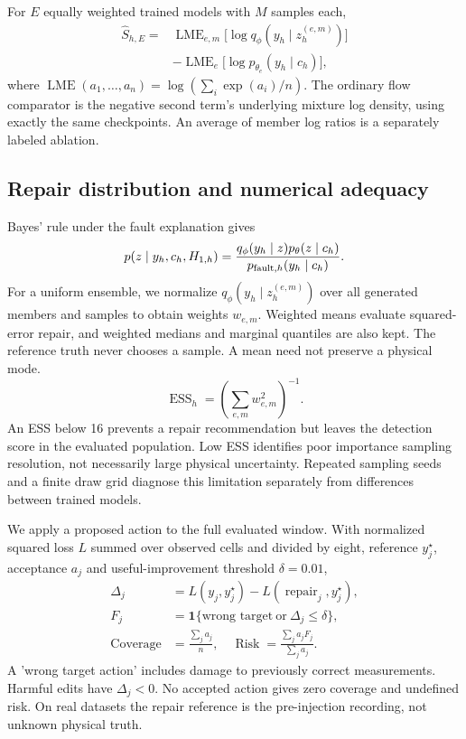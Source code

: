 \documentclass[conference]{IEEEtran}
\newcommand{\1}{\mathbf{1}}
\newcommand{\LME}{\operatorname{LME}}
\begin{document}
For $E$ equally weighted trained models with $M$ samples each,
\begin{equation}
\begin{split}
 \widehat S_{h,E}={}&\LME_{e,m}\bigl[\log q_\phi(y_h\mid z_h^{(e,m)})\bigr]\\
 &-\LME_e\bigl[\log p_{\theta_e}(y_h\mid c_h)\bigr],
\end{split}
\end{equation}
where $\LME(a_1,\ldots,a_n)=\log(\sum_i\exp(a_i)/n)$. The ordinary flow comparator is the negative second term's underlying mixture log density, using exactly the same checkpoints. An average of member log ratios is a separately labeled ablation.





\subsection{Repair distribution and numerical adequacy}
Bayes' rule under the fault explanation gives
\begin{equation}
 p(z\mid y_h,c_h,H_{1,h})=
 \frac{q_\phi(y_h\mid z)p_\theta(z\mid c_h)}{p_{{\rm fault},h}(y_h\mid c_h)}.
\end{equation}
For a uniform ensemble, we normalize $q_\phi(y_h\mid z_h^{(e,m)})$ over all generated members and samples to obtain weights $w_{e,m}$. Weighted means evaluate squared-error repair, and weighted medians and marginal quantiles are also kept. The reference truth never chooses a sample. A mean need not preserve a physical mode.
\begin{equation}
 \operatorname{ESS}_h=\left(\sum_{e,m}w_{e,m}^2\right)^{-1}.
\end{equation}
An ESS below 16 prevents a repair recommendation but leaves the detection score in the evaluated population. Low ESS identifies poor importance sampling resolution, not necessarily large physical uncertainty. Repeated sampling seeds and a finite draw grid diagnose this limitation separately from differences between trained models.

We apply a proposed action to the full evaluated window. With normalized squared loss $L$ summed over observed cells and divided by eight, reference $y_j^\star$, acceptance $a_j$ and useful-improvement threshold $\delta=0.01$,
\begin{equation}
\begin{split}
 \Delta_j&=L(y_j,y_j^\star)-L(\operatorname{repair}_j,y_j^\star),\\
 F_j&=\1\{\text{wrong target}\ \text{or}\ \Delta_j\leq\delta\},\\
 \operatorname{Coverage}&=\frac{\sum_j a_j}{n},\quad
 \operatorname{Risk}=\frac{\sum_j a_jF_j}{\sum_j a_j}.
\end{split}
\end{equation}
A 'wrong target action' includes damage to previously correct measurements. Harmful edits have $\Delta_j<0$. No accepted action gives zero coverage and undefined risk. On real datasets the repair reference is the pre-injection recording, not unknown physical truth.
\end{document}
